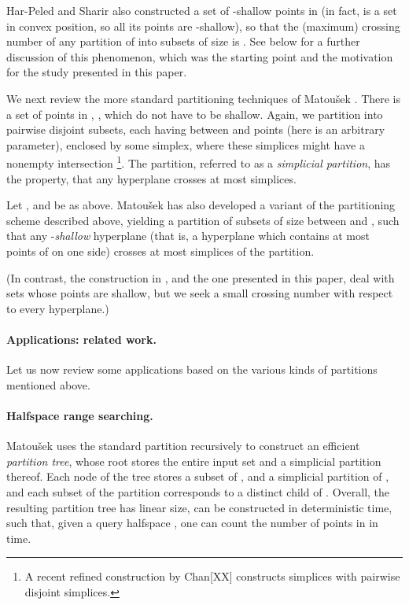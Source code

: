 \documentclass[11pt]{article}
\begin{document}
Har-Peled and Sharir also constructed a set  of  -shallow points in  (in fact,  is a set in convex position, so all its points are
-shallow), so that the (maximum) crossing number of any partition of  into subsets of size  is . See below for a
further discussion of this phenomenon, which was the starting point and the motivation for the study presented in this paper.

We next review the more standard partitioning techniques of Matou\v{s}ek \cite{mat92a,mat92b}. There  is a set of  points in , ,
which do not have to be shallow. Again, we partition  into  pairwise disjoint subsets, each having between  and  points (here  is an arbitrary parameter), enclosed by some simplex, where these simplices might have a nonempty intersection \footnote{A recent refined construction
by Chan[XX] constructs simplices with pairwise disjoint simplices.}. The partition, referred to as a \emph{simplicial partition}, has the property, that any
hyperplane  crosses at most  simplices.

Let ,  and  be as above. Matou\v{s}ek \cite{mat92b} has also developed a variant of the partitioning scheme described above, yielding a partition
of  subsets of size between  and , such that any -{\em shallow} hyperplane  (that is, a hyperplane which contains at most 
points of  on one side) crosses at most  simplices of the partition.

(In contrast, the construction in \cite{hs11}, and the one presented in this paper, deal with sets whose points are shallow, but we seek a small crossing
number with respect to every hyperplane.)


\paragraph{Applications: related work.} Let us now review some applications based on the various kinds of partitions mentioned above.

\paragraph{Halfspace range searching.} Matou\v{s}ek \cite{mat92a} uses the standard partition recursively to construct an efficient {\em partition tree},
whose root stores the entire input set  and a simplicial partition thereof. Each node  of the tree stores a subset  of , and a simplicial
partition of , and each subset of the partition corresponds to a distinct child of . Overall, the resulting partition tree has linear size, can be
constructed in  deterministic time, such that, given a query halfspace , one can count the number of points in  in
 time.
\end{document}
